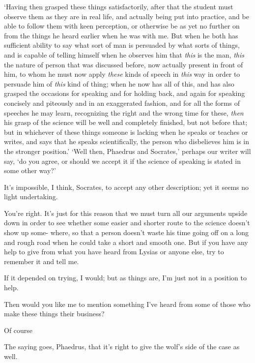 ‘Having then grasped these things satisfactorily, after that 
the student must observe them as they are in real life, and actually
being put into practice, and be able to follow them with keen
perception, or otherwise be as yet no further on from the things he
heard earlier when he was with me. But when he both has sufficient
ability to say what sort of man is persuaded by what sorts of things,
and is capable of telling himself when  he observes him that
{\em this} is the man, {\em this} the nature of person that was
discussed before, now actually present in front of him, to whom he must
now apply {\em these} kinds of speech in {\em this} way in order to
persuade him of {\em this} kind of thing; when he now has all of this,
and has also grasped the occasions for speaking  and for holding
back, and again for speaking concisely and piteously and in an
exaggerated fashion, and for all the forms of speeches he may learn,
recognizing the right and the wrong time for these, {\em then} his grasp
of the science will be well and completely finished, but not before
that; but in whichever of  these things someone is lacking when
he speaks or teaches or writes, and says that he speaks scientifically,
the person who disbelieves him is in the stronger position.' ‘Well then,
Phaedrus and Socrates,' perhaps our writer will say, ‘do you agree, or
should we accept it if the science of speaking is stated in some other
way?'

 It's impossible, I think, Socrates, to accept any
other description; yet it seems no light undertaking.

You're right. It's just for this reason that we must turn all
our arguments upside down in order to see whether some easier and
shorter route to the science doesn't show up some-  where, so
that a person doesn't waste his time going off on a long and rough road
when he could take a short and smooth one. But if you have any help to
give from what you have heard from Lysias or anyone else, try to
remember it and tell me.

If it depended on trying, I would; but as things are, 
I'm just not in a position to help.

Then would you like me to mention something I've heard from
some of those who make these things their business?

Of course

The saying goes, Phaedrus, that it's right to give the
 wolf's side of the case as well.

